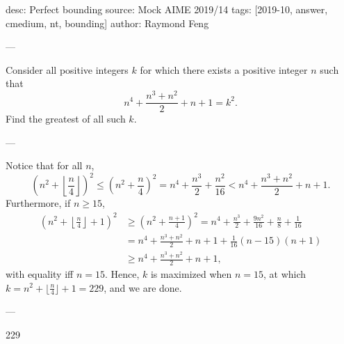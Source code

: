 desc: Perfect bounding
source: Mock AIME 2019/14
tags: [2019-10, answer, cmedium, nt, bounding]
author: Raymond Feng

---

Consider all positive integers $k$ for which there exists a positive integer $n$ such that \[n^4+\frac{n^3+n^2}{2}+n+1 = k^2.\]
Find the greatest of all such $k$.

---

Notice that for all $n$, \[\left(n^2+\left\lfloor\frac{n}{4}\right\rfloor\right)^2 \le \left(n^2+\frac{n}{4}\right)^2 = n^4+\frac{n^3}{2}+\frac{n^2}{16} < n^4+\frac{n^3+n^2}{2}+n+1.\]
Furthermore, if $n\ge 15$,
\begin{align*}
    \left(n^2+\left\lfloor\frac n4\right\rfloor+1\right)^2&\ge\left(n^2+\frac{n+1}4\right)^2=n^4+\frac{n^3}2+\frac{9n^2}{16} +\frac n8+\frac1{16} \\
    &=n^4+\frac{n^3+n^2}{2}+n+1+\frac{1}{16}(n-15)(n+1)\\
    &\ge n^4+\frac{n^3+n^2}{2}+n+1,
\end{align*}
with equality iff $n=15$. Hence, $k$ is maximized when $n=15$, at which $k=n^2+\lfloor\tfrac n4\rfloor+1=229$, and we are done.

---

229
